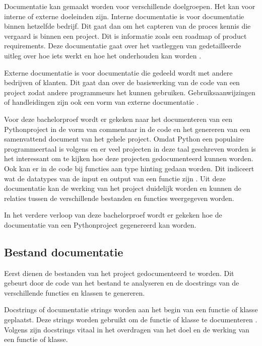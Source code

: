 Documentatie kan gemaakt worden voor verschillende doelgroepen. Het kan voor interne of externe doeleinden zijn.
Interne documentatie is voor documentatie binnen hetzelfde bedrijf.
Dit gaat dan om het capteren van de proces kennis die vergaard is binnen een project. Dit is informatie zoals een roadmap of product requirements. 
Deze documentatie gaat over het vastleggen van gedetaïlleerde uitleg over hoe iets werkt en hoe het onderhouden kan worden \autocite{swimm.io2024}.

Externe documentatie is voor documentatie die gedeeld wordt met andere bedrijven of klanten. 
Dit gaat dan over de basiswerking van de code van een project zodat andere programmeurs het kunnen gebruiken.
Gebruiksaanwijzingen of handleidingen zijn ook een vorm van externe documentatie \autocite{swimm.io2024}.

Voor deze bachelorproef wordt er gekeken naar het documenteren van een Pythonproject in de vorm van commentaar in de code en het genereren van een samenvattend document van het gehele project.
Omdat Python een populaire programmeertaal is volgens \textcite{TIOBE2024} en er veel projecten in deze taal geschreven worden is het interessant om te kijken hoe deze projecten gedocumenteerd kunnen worden.
Ook kan er in de code bij functies aan type hinting gedaan worden. Dit indiceert wat de datatypes van de input en output van een functie zijn \autocite{Bailey2024}.
Uit deze documentatie kan de werking van het project duidelijk worden en kunnen de relaties tussen de verschillende bestanden en functies weergegeven worden.

In het verdere verloop van deze bachelorproef wordt er gekeken hoe de documentatie van een Pythonproject gegenereerd kan worden.

\subsection{Bestand documentatie}
\label{sec:bestand-documentatie}
Eerst dienen de bestanden van het project gedocumenteerd te worden.
Dit gebeurt door de code van het bestand te analyseren en de docstrings van de verschillende functies en klassen te genereren.

Docstrings of documentatie strings worden aan het begin van een functie of klasse geplaatst.
Deze strings worden gebruikt om de functie of klasse te documenteren \autocite{GeeksforGeeks2023}.
Volgens \textcite{GeeksforGeeks2023} zijn docstrings vitaal in het overdragen van het doel en de werking van een functie of klasse.

